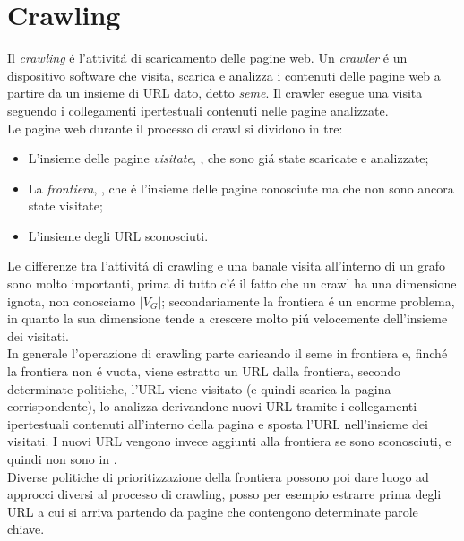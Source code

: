\section{Crawling}
Il \textit{crawling} é l'attivitá di scaricamento delle pagine web. Un \textit{crawler} é un dispositivo software che visita, scarica e analizza i contenuti delle pagine web a partire da un insieme di URL dato, detto \textit{seme}. Il crawler esegue una visita seguendo i collegamenti ipertestuali contenuti nelle pagine analizzate.\\
Le pagine web durante il processo di crawl si dividono in tre:
\begin{itemize}
    \item L'insieme delle pagine \textit{visitate}, , che sono giá state scaricate e analizzate;
    \item La \textit{frontiera}, , che é l'insieme delle pagine conosciute ma che non sono ancora state visitate;
    \item L'insieme  degli URL sconosciuti.
\end{itemize}
Le differenze tra l'attivitá di crawling e una banale visita all'interno di un grafo sono molto importanti, prima di tutto c'é il fatto che un crawl ha una dimensione ignota, non conosciamo $|V_G|$; secondariamente la frontiera é un enorme problema, in quanto la sua dimensione tende a crescere molto piú velocemente dell'insieme dei visitati.\\
In generale l'operazione di crawling parte caricando il seme in frontiera e, finché la frontiera non é vuota, viene estratto un URL dalla frontiera, secondo determinate politiche, l'URL viene visitato (e quindi scarica la pagina corrispondente), lo analizza derivandone nuovi URL tramite i collegamenti ipertestuali contenuti all'interno della pagina e sposta l'URL nell'insieme dei visitati. I nuovi URL vengono invece aggiunti alla frontiera se sono sconosciuti, e quindi non sono in .\\
Diverse politiche di prioritizzazione della frontiera possono poi dare luogo ad approcci diversi al processo di crawling, posso per esempio estrarre prima degli URL a cui si arriva partendo da pagine che contengono determinate parole chiave.
